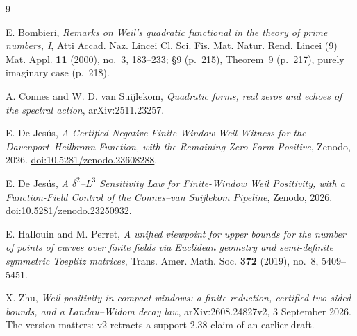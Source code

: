 \documentclass[11pt,a4paper]{article}
\theoremstyle{remark}
\begin{document}
\begin{thebibliography}{9}

 E. Bombieri,
\emph{Remarks on Weil's quadratic functional in the theory of prime numbers, I},
Atti Accad. Naz. Lincei Cl. Sci. Fis. Mat. Natur. Rend. Lincei (9) Mat. Appl. \textbf{11}
(2000), no.~3, 183--233; \S9 (p.~215), Theorem~9 (p.~217), purely imaginary case (p.~218).

 A. Connes and W. D. van Suijlekom,
\emph{Quadratic forms, real zeros and echoes of the spectral action}, arXiv:2511.23257.

 E. De Jes\'us,
\emph{A Certified Negative Finite-Window Weil Witness for the Davenport--Heilbronn
Function, with the Remaining-Zero Form Positive}, Zenodo, 2026.
\href{https://doi.org/10.5281/zenodo.23608288}{doi:10.5281/zenodo.23608288}.

 E. De Jes\'us,
\emph{A $\delta^2$--$L^3$ Sensitivity Law for Finite-Window Weil Positivity, with a
Function-Field Control of the Connes--van Suijlekom Pipeline}, Zenodo, 2026.
\href{https://doi.org/10.5281/zenodo.23250932}{doi:10.5281/zenodo.23250932}.

 E. Hallouin and M. Perret,
\emph{A unified viewpoint for upper bounds for the number of points of curves over finite
fields via Euclidean geometry and semi-definite symmetric Toeplitz matrices},
Trans. Amer. Math. Soc. \textbf{372} (2019), no.~8, 5409--5451.

 X. Zhu,
\emph{Weil positivity in compact windows: a finite reduction, certified two-sided bounds,
and a Landau--Widom decay law}, arXiv:2608.24827v2, 3 September 2026.
The version matters: v2 retracts a support-$2.38$ claim of an earlier draft.

\end{thebibliography}
\end{document}
